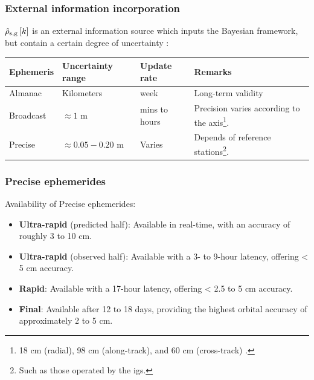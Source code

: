 \documentclass[
    hyperref={colorlinks,citecolor=DeepPink4,linkcolor=DarkRed,urlcolor=DarkBlue}
]{beamer_class}
\begin{document}
\begin{frame}[t]
	\frametitle{External information incorporation}
    

    \(\hat{\rho}_{\textnormal{s}, \textnormal{g}} \left[ k \right]\) is an external information source which inputs the Bayesian framework, but contain a certain degree of uncertainty \cite[Table 4.5]{hofmann-wellenhofGlobalPositioningSystem2012}:

    \begin{table}
    \centering
    \begin{tabular}{@{}>{\raggedright\arraybackslash}p{} >{\raggedright\arraybackslash}p{} >{\centering\arraybackslash}p{} >{\raggedright\arraybackslash}p{}@{}}
    \toprule
    Ephemeris & Uncertainty range & Update rate & Remarks \\
    \midrule
    Almanac & Kilometers & week & Long-term validity  \\
    \hline
    Broadcast & \(\approx 1\) m & mins to hours & Precision varies according to the axis\footnote{18 cm (radial), 98 cm (along-track), and 60 cm (cross-track) \cite{kaplanUnderstandingGPSGNSS2017}.}. \\
    \hline
    Precise & \(\approx 0.05-0.20\) m & Varies & Depends of reference stations\footnote{Such as those operated by the \gls{igs}.}. \\
    \bottomrule
    \end{tabular}
    \end{table}
\end{frame}


\begin{frame}
    \frametitle{Precise ephemerides}

    Availability of Precise ephemerides:
    \begin{itemize}
        \item \textbf{Ultra-rapid} (predicted half): Available in real-time, with an accuracy of roughly 3 to 10 cm.
        \item \textbf{Ultra-rapid} (observed half): Available with a 3- to 9-hour latency, offering < 5 cm accuracy.
        \item \textbf{Rapid}: Available with a 17-hour latency, offering < 2.5 to 5 cm accuracy.
        \item \textbf{Final}: Available after 12 to 18 days, providing the highest orbital accuracy of approximately 2 to 5 cm.
    \end{itemize}

\end{frame}
\end{document}
